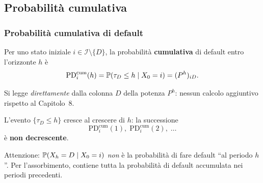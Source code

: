 

\subsection{Probabilit\`{a} cumulativa}%

\begin{frame}%
%

\frametitle{Probabilit\`{a} cumulativa di default}%
%

%


Per uno stato iniziale $i\in\mathcal{I}\setminus\{D\}$, la probabilit\`{a}
\textbf{cumulativa} di default entro l'orizzonte $h$ \`{e}
\[
\mathrm{PD}_{i}^{\mathrm{cum}}(h) = \mathbb{P}(\tau_{D}\leq h\mid X_{0}=i) =
(P^{h})_{iD}.
\]


\medskip

\begin{stepitemize}
\item Si legge \emph{direttamente} dalla colonna $D$ della potenza $P^{h}$:
nessun calcolo aggiuntivo rispetto al Capitolo~8.

\item L'evento $\{\tau_{D}\leq h\}$ cresce al crescere di $h$: la successione
\[
\mathrm{PD}_{i}^{\mathrm{cum}}(1), \; \mathrm{PD}_{i}^{\mathrm{cum}}(2), \;
\ldots
\]
\`{e} \textbf{non decrescente}.

\item Attenzione: $\mathbb{P}(X_{h}=D\mid X_{0}=i)$ \emph{non} \`{e} la
probabilit\`{a} di fare default ``al periodo $h$''. Per l'assorbimento,
contiene tutta la probabilit\`{a} di default accumulata nei periodi precedenti.
\end{stepitemize}

%

\transboxout
\end{frame}%




